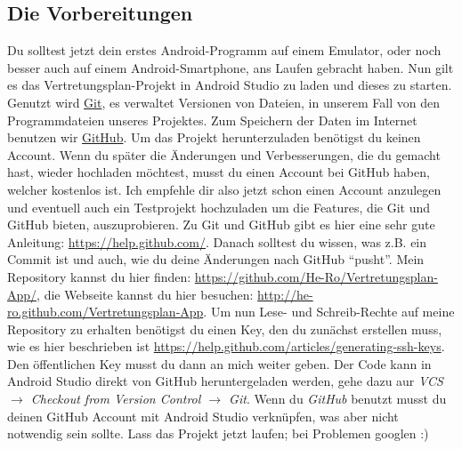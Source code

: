 \documentclass[12pt,headsepline]{scrartcl}
\begin{document}
\subsection{Die Vorbereitungen}
Du solltest jetzt dein erstes Android-Programm auf einem Emulator, oder noch besser auch auf einem Android-Smartphone, ans Laufen gebracht haben. Nun gilt es das Vertretungsplan-Projekt in Android Studio zu laden und dieses zu starten.
Genutzt wird \href{http://git-scm.com/}{Git}, es verwaltet Versionen von Dateien, in unserem Fall von den Programmdateien unseres Projektes. Zum Speichern der Daten im Internet benutzen wir \href{http://www.github.com}{GitHub}. Um das Projekt herunterzuladen benötigst du keinen Account. Wenn du später die Änderungen und Verbesserungen, die du gemacht hast, wieder hochladen möchtest, musst du einen Account bei GitHub haben, welcher kostenlos ist. Ich empfehle dir also jetzt schon einen Account anzulegen und eventuell auch ein Testprojekt hochzuladen um die Features, die Git und GitHub bieten, auszuprobieren. Zu Git und GitHub gibt es hier eine sehr gute Anleitung: \url{https://help.github.com/}. Danach solltest du wissen, was z.B. ein Commit ist und auch, wie du deine Änderungen nach GitHub ``pusht''.
Mein Repository kannst du hier finden: \url{https://github.com/He-Ro/Vertretungsplan-App/}, die Webseite kannst du hier besuchen: \url{http://he-ro.github.com/Vertretungsplan-App}.
Um nun Lese- und Schreib-Rechte auf meine Repository zu erhalten benötigst du einen Key, den du zunächst erstellen muss, wie es hier beschrieben ist \url{https://help.github.com/articles/generating-ssh-keys}.
Den öffentlichen Key musst du dann an mich weiter geben.
Der Code kann in Android Studio direkt von GitHub heruntergeladen werden, gehe dazu aur \textit{VCS $\rightarrow$ Checkout from Version Control $\rightarrow$ Git}. Wenn du \textit{GitHub} benutzt musst du deinen GitHub Account mit Android Studio verknüpfen, was aber nicht notwendig sein sollte.
Lass das Projekt jetzt laufen; bei Problemen googlen :)
\newpage
\end{document}
